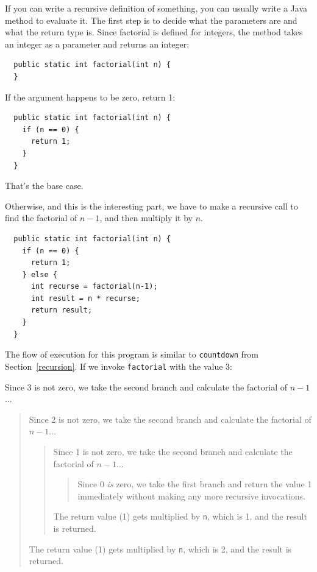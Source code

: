 \documentclass[12pt]{book}
\theoremstyle{exercise}
\begin{document}
If you can write a recursive definition of something, you can usually
write a Java method to evaluate it.  The first step is to decide what
the parameters are and what the return type is.  Since factorial is
defined for integers, the method takes an
integer as a parameter and returns an integer:

\begin{lstlisting}
  public static int factorial(int n) {
  }
\end{lstlisting}

\noindent If the argument happens to be zero, return 1:

\begin{lstlisting}
  public static int factorial(int n) {
    if (n == 0) {
      return 1;
    }
  }
\end{lstlisting}
%
That's the base case.

Otherwise, and this is the interesting part, we have to make
a recursive call to find the factorial of $n-1$, and then
multiply it by $n$.

\begin{lstlisting}
  public static int factorial(int n) {
    if (n == 0) {
      return 1;
    } else {
      int recurse = factorial(n-1);
      int result = n * recurse;
      return result;
    }
  }
\end{lstlisting}
%
The flow of execution for this program is similar to {\tt countdown}
from Section~\ref{recursion}.
If we invoke {\tt factorial} with the value 3:

Since 3 is not zero, we take the second branch and calculate
the factorial of $n-1$...

\begin{quote}
Since 2 is not zero, we take the second branch and calculate
the factorial of $n-1$...

\begin{quote}
Since 1 is not zero, we take the second branch and calculate
the factorial of $n-1$...

\begin{quote}
Since 0 {\em is} zero, we take the first branch and return
the value 1 immediately without making any more recursive
invocations.

\end{quote}

The return value (1) gets multiplied by {\tt n}, which is 1,
and the result is returned.

\end{quote}

The return value (1) gets multiplied by {\tt n}, which is 2,
and the result is returned.

\end{quote}
\end{document}
